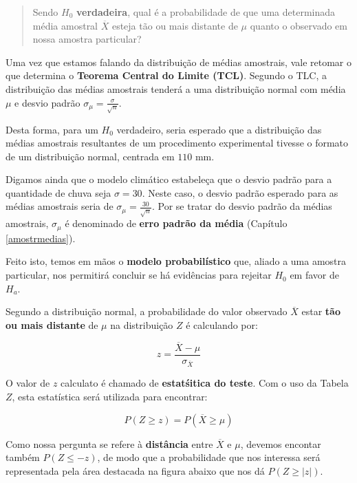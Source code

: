 \documentclass[
]{book}
\begin{document}
\begin{quote}
Sendo \(H_0\) \textbf{verdadeira}, qual é a probabilidade de que uma determinada média amostral \(\overline{X}\) esteja tão ou mais distante de \(\mu\) quanto o observado em nossa amostra particular?
\end{quote}

Uma vez que estamos falando da distribuição de médias amostrais, vale retomar o que determina o \textbf{Teorema Central do Limite (TCL)}. Segundo o TLC, a distribuição das médias amostrais tenderá a uma distribuição normal com média \(\mu\) e desvio padrão \(\sigma_{\mu} = \frac{\sigma}{\sqrt{n}}\).

Desta forma, para um \(H_0\) verdadeiro, seria esperado que a distribuição das médias amostrais resultantes de um procedimento experimental tivesse o formato de um distribuição normal, centrada em \(110\) mm.

Digamos ainda que o modelo climático estabeleça que o desvio padrão para a quantidade de chuva seja \(\sigma = 30\). Neste caso, o desvio padrão esperado para as médias amostrais seria de \(\sigma_{\mu} = \frac{30}{\sqrt{n}}\). Por se tratar do desvio padrão da médias amostrais, \(\sigma_{\mu}\) é denominado de \textbf{erro padrão da média} (Capítulo \ref{amostrmedias}).

Feito isto, temos em mãos o \textbf{modelo probabilístico} que, aliado a uma amostra particular, nos permitirá concluir se há evidências para rejeitar \(H_0\) em favor de \(H_a\).

Segundo a distribuição normal, a probabilidade do valor observado \(\overline{X}\) estar \textbf{tão ou mais distante} de \(\mu\) na distribuição \(Z\) é calculando por:

\[z = \frac{\overline{X} - \mu}{\sigma_{\overline{X}}}\]

O valor de \(z\) calculato é chamado de \textbf{estatśitica do teste}. Com o uso da Tabela \(Z\), esta estatística será utilizada para encontrar:

\[P(Z \ge z) = P(\overline{X} \ge \mu)\]

Como nossa pergunta se refere à \textbf{distância} entre \(\overline{X}\) e \(\mu\), devemos encontar também \(P(Z \le -z)\), de modo que a probabilidade que nos interessa será representada pela área destacada na figura abaixo que nos dá \(P(Z \ge |z|)\).
\end{document}
